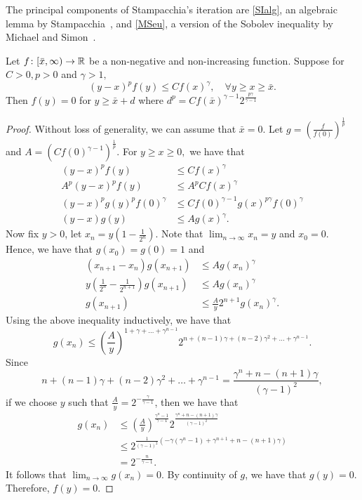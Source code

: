 The principal components of Stampacchia's iteration are \autoref{SIalg}, an algebraic lemma by Stampacchia~\cite{SJL_1963-1964___3_1_0}, and \autoref{MSeu}, a version of the Sobolev inequality by Michael and Simon~\cite{michael_sobolev_1973}.
\begin{lemma} \label{SIalg}
	Let $f \colon [\bar{x},\infty) \to \mathbb{R}$ be a non-negative and non-increasing function. Suppose for $C>0, p>0$ and $\gamma >1,$ 
	\[ (y-x)^{p}f(y) \leq Cf(x)^{\gamma },\quad \forall y \geq x \geq \bar{x}.\] 
	Then $f(y)=0$ for $y \geq \bar{x} + d$ where $d^p=C f(\bar{x})^{\gamma -1}2^{\frac{p \gamma }{\gamma -1}}$ 
\end{lemma}
\begin{proof}
	Without loss of generality, we can assume that $\bar{x}=0.$ 
	Let $g=(\frac{f}{f(0)})^{\frac{1}{p}}$ and $A=(Cf(0)^{\gamma -1})^{\frac{1}{p}}.$ For $y \geq x \geq 0,$ we have that
	\begin{align*}
		(y-x)^{p}f(y) &\leq Cf(x)^{\gamma }\\
		A^p (y-x)^{p}f(y) &\leq A^p Cf(x)^{\gamma }\\
		(y-x)^p g(y)^p f(0)^{\gamma } &\leq C f(0)^{\gamma-1 }g(x)^{p \gamma } f(0)^{\gamma }\\
		(y-x)g(y) &\leq A g(x)^{\gamma }.
	\end{align*}
	Now fix $y>0$, let $x_n=y(1-\frac{1}{2^n})$. Note that $\lim_{n \to \infty} x_n=y$ and $x_0=0.$ Hence, we have that $g(x_0)=g(0)=1$ and 
	\begin{align*}
		(x_{n+1}-x_n)g(x_{n+1}) &\leq Ag(x_{n}^{} )^{\gamma }\\
		y(\frac{1}{2^{n}}-\frac{1}{2^{n+1}})g(x_{n+1}^{} ) &\leq Ag(x_{n}^{} )^{\gamma }\\
		g(x_{n+1}^{} ) &\leq \frac{A}{y}2^{n+1} g(x_{n}^{} )^{\gamma }.
	\end{align*} 
	Using the above inequality inductively, we have that \[g(x_{n}^{} ) \leq (\frac{A}{y})^{1+\gamma + \dots + \gamma ^{n-1}} 2^{n+(n-1)\gamma + (n-2)\gamma ^2 + \dots + \gamma ^{n-1}}.\]
	Since \[n+(n-1)\gamma + (n-2)\gamma ^2 + \dots + \gamma ^{n-1}=\frac{\gamma ^n+n-(n+1)\gamma }{(\gamma -1)^2},\]
	if we choose $y$ such that $\frac{A}{y}=2^{-\frac{\gamma }{\gamma -1}}$, then we have that 
	\begin{equation*}
	\begin{split}
		g(x_{n}^{} ) 
	&\leq  (\frac{A}{y})^{\frac{\gamma ^n-1}{\gamma -1}} 2^{\frac{\gamma ^n+n-(n+1)\gamma }{(\gamma -1)^2}} \\
	&\leq 2^{\frac{1}{(\gamma -1)^2}(-\gamma (\gamma ^n-1)+\gamma ^{n+1}+n-(n+1)\gamma )}\\
	&=2^{-\frac{n}{\gamma -1}}.
	\end{split}
	\end{equation*}
	It follows that $\lim_{n \to \infty} g(x_n)=0$. By continuity of $g$, we have that $g(y)=0.$ Therefore, $f(y)=0.$  
\end{proof}

